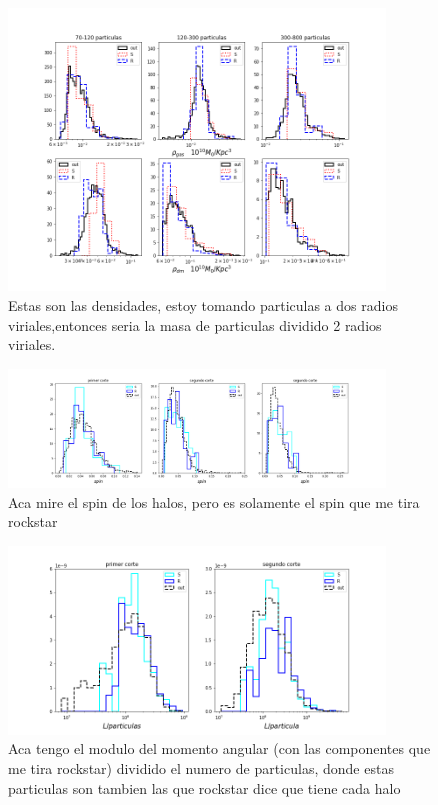 \begin{figure}[h]
\centering
\includegraphics[width=10cm]{Figures/Densidades_cortemasa.png}
\decoRule
\caption[asd]{Estas son las densidades, estoy tomando particulas a dos radios viriales,entonces seria la masa de particulas dividido 2 radios viriales.  }
\label{fig:Electron}
\end{figure}

\begin{figure}[h]
\centering
\includegraphics[width=10cm]{Figures/Spin_cortemasa.png}
\decoRule
\caption[asd]{Aca mire el spin de los halos, pero es solamente el spin que me tira rockstar  }
\label{fig:Electron}
\end{figure}

\begin{figure}[h]
\centering
\includegraphics[width=10cm]{Figures/Momangular_cortemasa.png}
\decoRule
\caption[asd]{Aca tengo el modulo del momento angular (con las componentes que me tira rockstar) dividido el numero de particulas, donde estas particulas son tambien las que rockstar dice que tiene cada halo }
\label{fig:Electron}
\end{figure}

